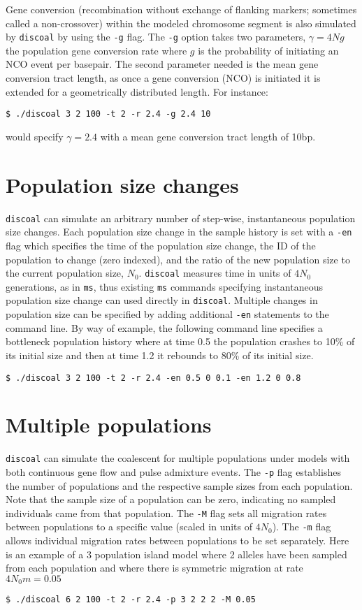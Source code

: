 \documentclass[12pt]{article}
\begin{document}
Gene conversion (recombination without exchange of flanking markers; sometimes called a non-crossover) within the modeled chromosome segment is also simulated by \texttt{discoal} by using the \texttt{-g} flag. The \texttt{-g} option takes two parameters, $\gamma=4Ng$ the population gene conversion rate where $g$ is the probability of initiating an NCO event per basepair. The second parameter needed is the mean gene conversion tract length, as once a gene conversion (NCO) is initiated it is extended for a geometrically distributed length. For instance:
\begin{verbatim}
$ ./discoal 3 2 100 -t 2 -r 2.4 -g 2.4 10
\end{verbatim}
would specify $\gamma=2.4$ with a mean gene conversion tract length of 10bp. 


\section*{Population size changes}
\texttt{discoal} can simulate an arbitrary number of step-wise, instantaneous population size changes. Each population size
change in the sample history is set with a \texttt{-en} flag which specifies the time of the population size change, the ID of the population to change (zero indexed), and the ratio of the new population size to the current population size, $N_0$. \texttt{discoal} measures time in units of $4N_0$ generations, as in \texttt{ms}, thus existing \texttt{ms} commands specifying instantaneous population size change can used directly in \texttt{discoal}. Multiple changes in population size can be specified by adding additional \texttt{-en} statements to the command line. By way of example, the following command line specifies a bottleneck population history where at time 0.5 the population crashes to 10\% of its initial size and then at time 1.2 it rebounds to 80\% of its initial size. 
\begin{verbatim}
$ ./discoal 3 2 100 -t 2 -r 2.4 -en 0.5 0 0.1 -en 1.2 0 0.8
\end{verbatim}

\section*{Multiple populations}
\texttt{discoal} can simulate the coalescent for multiple populations under models with both continuous gene flow and pulse admixture events. The \texttt{-p} flag establishes the number of populations and the respective sample sizes from each population. Note that the sample size of a population can be zero, indicating no sampled individuals came from that population. The \texttt{-M} flag sets all migration rates between populations to a specific value (scaled in units of $4N_0$). The \texttt{-m} flag allows individual migration rates between populations to be set separately. Here is an example of a 3 population island model where 2 alleles have been sampled from each population and where there is symmetric migration at rate $4N_0m = 0.05$
\begin{verbatim}
$ ./discoal 6 2 100 -t 2 -r 2.4 -p 3 2 2 2 -M 0.05
\end{verbatim}
\end{document}
